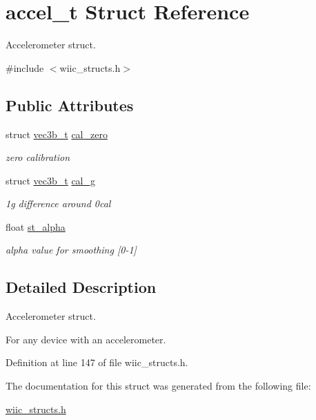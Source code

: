 \hypertarget{structaccel__t}{\section{accel\-\_\-t \-Struct \-Reference}
\label{structaccel__t}
}


\-Accelerometer struct.  




{\ttfamily \#include $<$wiic\-\_\-structs.\-h$>$}

\subsection*{\-Public \-Attributes}
\begin{DoxyCompactItemize}
\item 
\hypertarget{structaccel__t_aebbccd4f86055e4265579a425ea0cec7}{struct \hyperlink{structvec3b__t}{vec3b\-\_\-t} \hyperlink{structaccel__t_aebbccd4f86055e4265579a425ea0cec7}{cal\-\_\-zero}}\label{structaccel__t_aebbccd4f86055e4265579a425ea0cec7}

\begin{DoxyCompactList}\small\item\em zero calibration \end{DoxyCompactList}\item 
\hypertarget{structaccel__t_ac1d5d7814dcaf180e02f6180967d4afc}{struct \hyperlink{structvec3b__t}{vec3b\-\_\-t} \hyperlink{structaccel__t_ac1d5d7814dcaf180e02f6180967d4afc}{cal\-\_\-g}}\label{structaccel__t_ac1d5d7814dcaf180e02f6180967d4afc}

\begin{DoxyCompactList}\small\item\em 1g difference around 0cal \end{DoxyCompactList}\item 
\hypertarget{structaccel__t_a6aa36a40f82af45cb67f8db9ff8b41ca}{float \hyperlink{structaccel__t_a6aa36a40f82af45cb67f8db9ff8b41ca}{st\-\_\-alpha}}\label{structaccel__t_a6aa36a40f82af45cb67f8db9ff8b41ca}

\begin{DoxyCompactList}\small\item\em alpha value for smoothing \mbox{[}0-\/1\mbox{]} \end{DoxyCompactList}\end{DoxyCompactItemize}


\subsection{\-Detailed \-Description}
\-Accelerometer struct. 

\-For any device with an accelerometer. 

\-Definition at line 147 of file wiic\-\_\-structs.\-h.



\-The documentation for this struct was generated from the following file\-:\begin{DoxyCompactItemize}
\item 
\hyperlink{wiic__structs_8h}{wiic\-\_\-structs.\-h}\end{DoxyCompactItemize}

